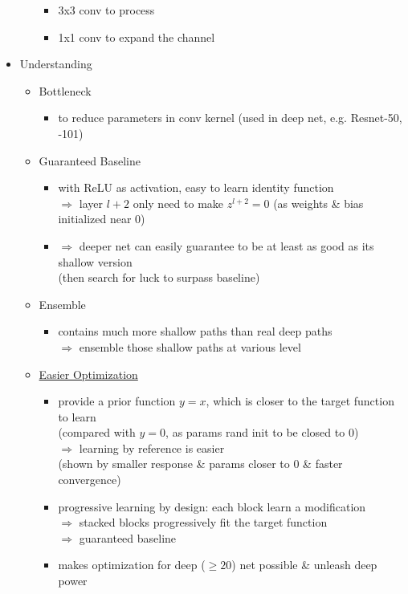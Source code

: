 \begin{itemize}
\begin{itemize}
\begin{itemize}
		\item 3x3 conv to process
		\item 1x1 conv to expand the channel
		\end{itemize}
	\end{itemize}
\item Understanding
	\begin{itemize}
	\item Bottleneck
		\begin{itemize}
		\item to reduce parameters in conv kernel (used in deep net, e.g. Resnet-50, -101)
		\end{itemize}
	\item Guaranteed Baseline
		\begin{itemize}
		\item with ReLU as activation, easy to learn identity function \\ 
		$\Rightarrow$ layer $l+2$ only need to make $z^{l+2}=0$ (as weights \& bias initialized near $0$)
		\item $\Rightarrow$ deeper net can easily guarantee to be at least as good as its shallow version \\
		(then search for luck to surpass baseline)
		\end{itemize}
	\item Ensemble
		\begin{itemize}
		\item contains much more shallow paths than real deep paths \\
		$\Rightarrow$ ensemble those shallow paths at various level
		\end{itemize}
	\item \underline{Easier Optimization}
		\begin{itemize}
		\item provide a prior function $y=x$, which is closer to the target function to learn \\
		(compared with $y=0$, as params rand init to be closed to $0$) \\
		$\Rightarrow$ learning by reference is easier \\
		(shown by smaller response \& params closer to $0$ \& faster convergence)
		\item progressive learning by design: each block learn a modification \\
		$\Rightarrow$ stacked blocks progressively fit the target function \\ 
		$\Rightarrow$ guaranteed baseline
		\item makes optimization for deep ($\ge 20$) net possible \& unleash deep power
		\end{itemize}
	\end{itemize}
\end{itemize}

